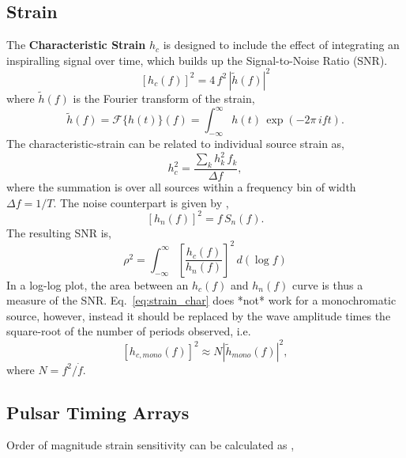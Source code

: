 \documentclass[10pt, oneside, onecolumn]{article}   	%
\begin{document}
    \subsection{Strain}
    The \textbf{Characteristic Strain} $h_c$ is designed to include the effect of integrating an inspiralling signal over time, which builds up the Signal-to-Noise Ratio (SNR).
    \begin{equation}
    \label{eq:strain_char}
    \left[h_c(f)\right]^2 = 4 \, f^2\, \left| \tilde{h}(f)\right|^2
    \end{equation}
    where $\tilde{h}(f)$ is the Fourier transform of the strain,
    \begin{equation}
    \tilde{h}(f) = \mathcal{F}\{ h(t) \}(f) = \int_{-\infty}^\infty h(t) \,  \exp\left(-2\pi \, i f t\right).
    \end{equation}
    The characteristic-strain can be related to individual source strain as,
    \begin{equation}
    h_c^2 = \frac{\sum_k h_k^2 \, f_k}{\Delta f},
    \end{equation}
    where the summation is over all sources within a frequency bin of width $\Delta f = 1/T$.
    The noise counterpart is given by \citep{moore2015},
    \begin{equation}
    \left[h_n(f)\right]^2 = f \, S_n(f).
    \end{equation}
    The resulting SNR is,
    \begin{equation}
    \rho^2 = \int_{-\infty}^{\infty} \left[ \frac{h_c(f)}{h_n(f)} \right]^2 \, d\left(\log f\right)
    \end{equation}
    In a log-log plot, the area between an $h_c(f)$ and $h_n(f)$ curve is thus a measure of the SNR.  Eq.~\ref{eq:strain_char} does *not* work for a monochromatic source, however, instead it should be replaced by the wave amplitude times the square-root of the number of periods observed, i.e.
    \begin{equation}
    \left[h_{c,mono}(f)\right]^2 \approx N \left|\tilde{h}_{mono}(f)\right|^2,
    \end{equation}
    where $N = f^2 / \dot{f}$.

    \subsection{Pulsar Timing Arrays}

    Order of magnitude strain sensitivity can be calculated as \citep[][Eq.~21]{rajagopal1995},
\end{document}
